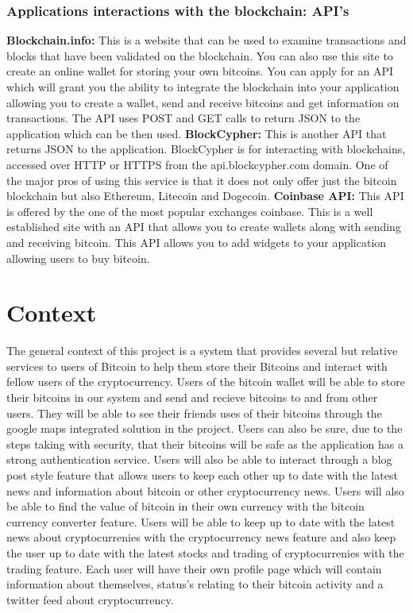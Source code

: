 \subsection{Applications interactions with the blockchain: API's}
\textbf{Blockchain.info:} This is a website that can be used to examine transactions and blocks that have been validated on the blockchain. You can also use this site to create an online wallet for storing your own bitcoins. You can apply for an API which will grant you the ability to integrate the blockchain into your application allowing you to create a wallet, send and receive bitcoins and get information on transactions. The API uses POST and GET calls to return JSON to the application which can be then used. \break
\textbf{BlockCypher:} This is another API that returns JSON to the application. BlockCypher is for interacting with blockchains, accessed over HTTP or HTTPS from the api.blockcypher.com domain. One of the major pros of using this service is that it does not only offer just the bitcoin blockchain but also Ethereum, Litecoin and Dogecoin. \break
\textbf{Coinbase API:} This API is offered by the one of the most popular exchanges coinbase. This is a well established site with an API that allows you to create wallets along with sending and receiving bitcoin. This API allows you to add widgets to your application allowing users to buy bitcoin.

\chapter{Context}
The general context of this project is a system that provides several but relative services to users of Bitcoin to help them store their Bitcoins and interact with fellow users of the cryptocurrency. Users of the bitcoin wallet will be able to store their bitcoins in our system and send and recieve bitcoins to and from other users. They will be able to see their friends uses of their bitcoins through the google maps integrated solution in the project. Users can also be sure, due to the steps taking with security, that their bitcoins will be safe as the application has a strong authentication service. Users will also be able to interact through a blog post style feature that allows users to keep each other up to date with the latest news and information about bitcoin or other cryptocurrency news. Users will also be able to find the value of bitcoin in their own currency with the bitcoin currency converter feature. Users will be able to keep up to date with the latest news about cryptocurrenies with the cryptocurrency news feature and also keep the user up to date with the latest stocks and trading of cryptocurrenies with the trading feature. Each user will have their own profile page which will contain information about themselves, status's relating to their bitcoin activity and a twitter feed about cryptocurrency.


